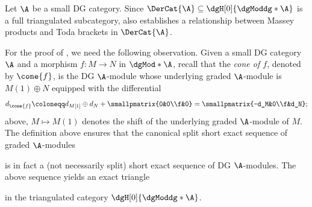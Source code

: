 \documentclass[a4paper]{amsart}
\begin{document}
\begin{remark}
  Let $\A$ be a small DG category. Since
  $\DerCat{\A}\subseteq\dgH[0]{\dgModdg*{\A}}$ is a full triangulated
  subcategory,  also establishes a relationship between
  Massey products and Toda brackets in $\DerCat{\A}$.
\end{remark}

For the proof of , we need the following observation. Given
a small DG category $\A$ and a morphism $f\colon M\to N$ in $\dgMod*{\A}$,
recall that the \emph{cone of $f$}, denoted by $\cone{f}$, is the DG $\A$-module
whose underlying graded $\A$-module is $M(1)\oplus N$ equipped with the
differential
\[
  d_{\cone{f}}\coloneqq d_{M[1]}\oplus
  d_N+\smallpmatrix{0&0\\f&0}=\smallpmatrix{-d_M&0\\f&d_N};
\]
above, $M\mapsto M(1)$ denotes the shift of the underlying graded $\A$-module of $M$.
The definition above ensures that the canonical split short exact sequence of
graded $\A$-modules
\begin{center}
\end{center}
is in fact a (not necessarily split) short exact sequence of DG $\A$-modules.
The above sequence yields an exact triangle
\begin{center}
\end{center}
in the triangulated category $\dgH[0]{\dgModdg*{\A}}$.
\end{document}

